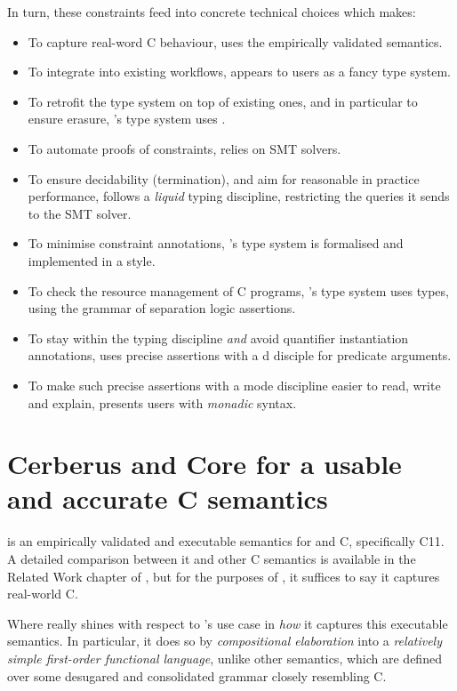 In turn, these constraints feed into concrete technical choices which 
makes:
\begin{itemize}
    \item To capture real-word C behaviour,  uses the 
        empirically validated semantics.
    \item To integrate into existing workflows,  appears to users
        as a fancy type system.
    \item To retrofit the type system on top of existing ones, and in
	particular to ensure erasure, 's type system uses
	.
    \item To automate proofs of constraints,  relies on SMT solvers.
    \item To ensure decidability (termination), and aim for reasonable in
        practice performance,  follows a \emph{liquid} typing
	discipline, restricting the queries it sends to the SMT solver.
    \item To minimise constraint annotations, 's type system is
        formalised and implemented in a  style.
    \item To check the resource management of C programs, 's type
        system uses  types, using the grammar of separation
        logic assertions.
    \item To stay within the  typing discipline \emph{and} avoid
	quantifier instantiation annotations,  uses precise assertions
	with a d disciple for predicate arguments.
    \item To make such precise assertions with a mode discipline easier to read,
	write and explain,  presents users with \emph{monadic} syntax.
\end{itemize}

\section{Cerberus and Core for a usable and accurate C semantics}%
\label{sec:cerberus-core}

 is an empirically validated and executable semantics for
 and  C, specifically C11. A detailed comparison
between it and other C semantics is available in the Related Work chapter
of , but for the purposes of ,
it suffices to say it captures real-world C.

Where  really shines with respect to 's use case in
\emph{how} it captures this executable semantics. In particular, it does so by
\emph{compositional elaboration} into a \emph{relatively simple first-order
functional language}, unlike other semantics, which are defined over some
desugared and consolidated grammar closely resembling C.


